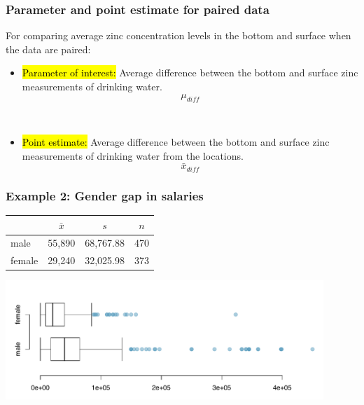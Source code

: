 \documentclass[11pt,containsverbatim,handout,xcolor=xelatex,dvipsnames,table]{beamer}
\begin{document}
\begin{frame}
\frametitle{Parameter and point estimate for paired data}

For comparing average zinc concentration levels in the bottom and surface when the data are paired:

\pause

\begin{itemize}

\item \hl{Parameter of interest:} Average difference between the bottom and surface zinc measurements of  drinking water.
\[ \mu_{diff} \]

$\:$ \\

\pause

\item \hl{Point estimate:} Average difference between the bottom and surface zinc measurements of drinking water from the  locations.
\[ \bar{x}_{diff} \]

\end{itemize}

\end{frame}


\begin{frame}
\frametitle{Example 2: Gender gap in salaries}


\begin{center}
%
{\small
\begin{tabular}{lccc}
\hline
			& $\bar{x}$ 	& $s$	& $n$ \\
\hline
male			& 55,890		& 68,767.88	& 470 \\
female		& 29,240		& 32,025.98	& 373 \\
\hline
\end{tabular}
}
%
\includegraphics[width=0.9\textwidth]{figures/acs/sal_gen_box}
\end{center}

\end{frame}
\end{document}
